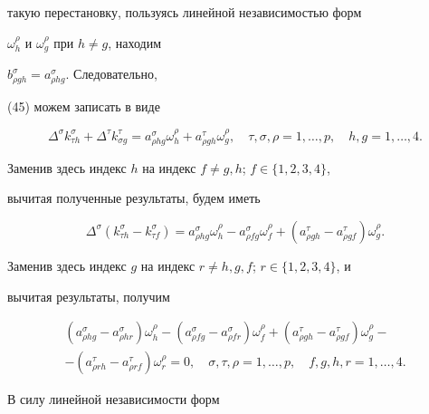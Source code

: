 \begin{pf}
такую перестановку, пользуясь линейной независимостью форм


$\omega^{\rho}_h$ и $\omega^{\rho}_g$ при $h\ne g$, находим


$b^{\sigma}_{\rho gh}=a^{\sigma}_{\rho hg}$. Следовательно,


(45) можем записать в виде


\begin{equation}


\Delta^{\sigma}k^{\sigma}_{\tau h}+


\Delta^{\tau}k^{\tau}_{\sigma g}=


a^{\sigma}_{\rho hg}\omega^{\rho}_h+


a^{\tau}_{\rho gh}\omega^{\rho}_g,\quad


\tau,\sigma,\rho=1,\dotsc,p,\quad


h,g=1,\dotsc,4.


\end{equation}


Заменив здесь индекс $h$ на индекс $f\ne g,h$; $f\in\{1,2,3,4\}$,


вычитая полученные результаты, будем иметь


$$


\Delta^{\sigma}(k^{\sigma}_{\tau h}-k^{\sigma}_{\tau f})=


a^{\sigma}_{\rho hg}\omega^{\rho}_h-


a^{\sigma}_{\rho fg}\omega^{\rho}_f+


(a^{\tau}_{\rho gh}-a^{\tau}_{\rho gf})\omega^{\rho}_g.


$$


Заменив здесь индекс $g$ на индекс $r\ne h,g,f$; $r\in\{1,2,3,4\}$, и


вычитая результаты, получим


\begin{multline*}


(a^{\sigma}_{\rho hg}-a^{\sigma}_{\rho hr})\omega^{\rho}_h-


(a^{\sigma}_{\rho fg}-a^{\sigma}_{\rho fr})\omega^{\rho}_f+


(a^{\tau}_{\rho gh}-a^{\tau}_{\rho gf})\omega^{\rho}_g-\\


-(a^{\tau}_{\rho rh}-a^{\tau}_{\rho rf})\omega^{\rho}_r=0,\quad


\sigma,\tau,\rho=1,\dotsc,p,\quad  f,g,h,r=1,\dotsc,4.


\end{multline*}


В силу линейной независимости форм



\end{pf}
